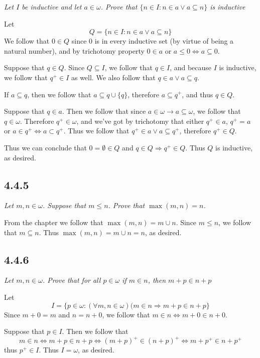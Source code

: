 \documentclass[11pt,oneside,titlepage]{book}
\DeclareMathOperator \lra {\Leftrightarrow}
\DeclareMathOperator \ra {\Rightarrow}
\begin{document}
\textit{Let $I$ be inductive and let $a \in \omega$. Prove that
  $\{n \in I: n \in a \lor a \subseteq n\}$ is inductive }

Let
$$ Q = \{n \in I: n \in a \lor a \subseteq n\}$$
We follow that $0 \in Q$ since $0$ is in every inductive set (by virtue of being a natural number),
and by trichotomy property $0 \in a$ or $a \leq 0 \lra a \subseteq 0$.

Suppose that $q \in Q$. Since $Q \subseteq I$, we follow that $q \in I$, and
because $I$ is inductive, we follow that $q^+ \in I$ as well.
We also follow that $q \in a \lor a \subseteq q$.

If $a \subseteq q$, then we follow that $a \subseteq q \cup \{q\}$, therefore $a \subseteq q^+$,
and thus $q \in Q$.

Suppose that $q \in a$. Then we follow that since $a \in \omega \to a \subseteq \omega$,
we follow that $q \in \omega$. Therefore $q^+ \in \omega$, and
we've got by trichotomy that either $q^+ \in a$, $q^+ = a$ or $a \in q^+ \lra a \subset q^+$.
Thus we follow that $q^+ \in a \lor a \subseteq q^+$, therefore $q^+ \in Q$.

Thus we can conclude that $0 = \emptyset \in Q$ and $q \in Q \ra q^+ \in Q$. Thus $Q$ is
inductive, as desired.


\subsection*{4.4.5}

\textit{Let $m, n \in \omega$. Suppose that $m \leq n$. Prove that $\max(m, n) = n$.}

From the chapter we follow that $\max(m, n) = m \cup n$. Since $m \leq n$, we follow that
$m \subseteq n$. Thus $\max(m, n) = m \cup n = n$, as desired.

\subsection*{4.4.6}

\textit{Let $m, n \in \omega$. Prove that for all $p \in \omega$ if $m \in n$, then
  $m + p \in n + p$}

Let
$$I = \{p \in \omega: (\forall m, n \in \omega)(m \in n \ra m + p \in n + p\}$$
Since $m + 0 = m$ and $n = n + 0$, we follow that $m \in n \lra m + 0 \in n + 0$.

Suppose that $p \in I$. Then we follow that
$$m \in n \lra m + p \in n + p \lra (m + p)^+ \in (n + p)^+ \lra m + p^+ \in n + p^+$$
thus $p^+ \in I$. Thus $I = \omega$, as desired.
\end{document}
